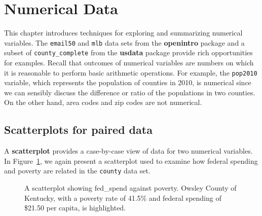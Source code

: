 \documentclass[
  letterpaper,
  DIV=11,
  numbers=noendperiod]{scrreprt}
\begin{document}
\section{Numerical Data}\label{numerical-data-1}

This chapter introduces techniques for exploring and summarizing
numerical variables. The \texttt{email50} and \texttt{mlb} data sets
from the \textbf{openintro} package and a subset of
\texttt{county\_complete} from the \textbf{usdata} package provide rich
opportunities for examples. Recall that outcomes of numerical variables
are numbers on which it is reasonable to perform basic arithmetic
operations. For example, the \texttt{pop2010} variable, which represents
the population of counties in 2010, is numerical since we can sensibly
discuss the difference or ratio of the populations in two counties. On
the other hand, area codes and zip codes are not numerical.

\subsection{Scatterplots for paired
data}\label{scatterplots-for-paired-data}

A \textbf{scatterplot} provides a case-by-case view of data for two
numerical variables. In Figure~\ref{fig-scat5}, we again present a
scatterplot used to examine how federal spending and poverty are related
in the \texttt{county} data set.

\begin{figure}


\caption{\label{fig-scat5}A scatterplot showing fed\_spend against
poverty. Owsley County of Kentucky, with a poverty rate of 41.5\% and
federal spending of \$21.50 per capita, is highlighted.}

\end{figure}%
\end{document}
